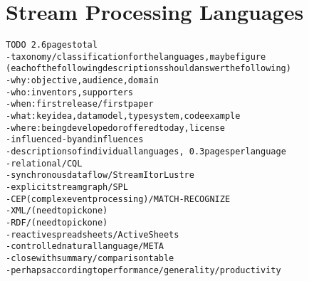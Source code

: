 \section{Stream Processing Languages}\label{sec:languages}

\begin{alltt}TODO\scriptsize ~2.6 pages total
- taxonomy/classification for the languages, maybe figure
  (each of the following descriptions should answer the following)
  - why: objective, audience, domain
  - who: inventors, supporters
  - when: first release / first paper
  - what: key idea, data model, type system, code example
  - where: being developed or offered today, license
  - influenced-by and influences
- descriptions of individual languages, ~0.3 pages per language
  - relational / CQL \cite{arasu_babu_widom_2006}
  - synchronous dataflow / StreamIt \cite{thies_et_al_2002} or Lustre
  - explicit stream graph / SPL \cite{hirzel_schneider_gedik_2017} \cite{soule_et_al_2010}
  - CEP (complex event processing) / MATCH-RECOGNIZE \cite{zemke_et_al_2007} \cite{hirzel_2012}
  - XML / (need to pick one)
  - RDF / (need to pick one)
  - reactive spreadsheets / ActiveSheets \cite{vaziri_et_al_2014}
  - controlled natural language / META \cite{arnold_et_al_2016}
- close with summary/comparison table
  - perhaps according to performance/generality/productivity
\end{alltt}
